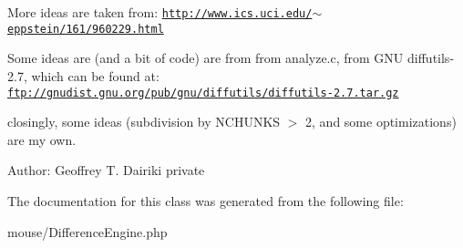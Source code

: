 More ideas are taken from: \href{http://www.ics.uci.edu/~eppstein/161/960229.html}{\tt http://www.ics.uci.edu/$\sim$eppstein/161/960229.html}

Some ideas are (and a bit of code) are from from analyze.c, from GNU diffutils-2.7, which can be found at: \href{ftp://gnudist.gnu.org/pub/gnu/diffutils/diffutils-2.7.tar.gz}{\tt ftp://gnudist.gnu.org/pub/gnu/diffutils/diffutils-2.7.tar.gz}

closingly, some ideas (subdivision by NCHUNKS $>$ 2, and some optimizations) are my own.

\begin{Desc}
\item[Author:]Geoffrey T. Dairiki  private \end{Desc}


The documentation for this class was generated from the following file:\begin{CompactItemize}
\item 
mouse/DifferenceEngine.php\end{CompactItemize}
